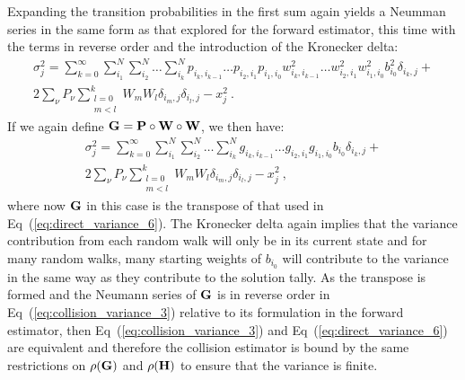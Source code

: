 Expanding the transition probabilities in the first sum again yields a
Neumman series in the same form as that explored for the forward
estimator, this time with the terms in reverse order and the
introduction of the Kronecker delta:
\begin{multline}
  \sigma_j^2 = \sum_{k=0}^{\infty}\sum_{i_1}^{N}\sum_{i_2}^{N}\ldots
  \sum_{i_k}^{N} p_{i_k,i_{k-1}}\ldots p_{i_2,i_1} p_{i_1,i_0}
  w^2_{i_k,i_{k-1}}\ldots w^2_{i_2,i_1} w^2_{i_1,i_0}
  b^2_{i_0}\delta_{i_k,j} + \\ 2 \sum_{\nu} P_{\nu} \sum_{\substack{
      l=0 \\ m<l}}^k W_m W_l \delta_{i_m,j} \delta_{i_l,j} - x_j^2\:.
  \label{eq:collision_variance_2}
\end{multline}
If we again define $\mathbf{G} = \mathbf{P} \circ \mathbf{W} \circ \mathbf{W}$, we
then have:
\begin{multline}
  \sigma^2_j = \sum_{k=0}^{\infty}\sum_{i_1}^{N}\sum_{i_2}^{N}\ldots
  \sum_{i_k}^{N}g_{i_{k},i_{k-1}} \ldots
  g_{i_2,i_1}g_{i_1,i_0}b_{i_0}\delta_{i_k,j} + \\ 2 \sum_{\nu}
  P_{\nu} \sum_{\substack{ l=0 \\ m<l}}^k W_m W_l \delta_{i_m,j}
  \delta_{i_l,j} - x_j^2\:,
\label{eq:collision_variance_3}
\end{multline}
where now $\mathbf{G}$ in this case is the transpose of that used in
Eq~(\ref{eq:direct_variance_6}). The Kronecker delta again implies
that the variance contribution from each random walk will only be in
its current state and for many random walks, many starting weights of
$b_{i_0}$ will contribute to the variance in the same way as they
contribute to the solution tally. As the transpose is formed and the
Neumann series of $\mathbf{G}$ is in reverse order in
Eq~(\ref{eq:collision_variance_3}) relative to its formulation in the
forward estimator, then Eq~(\ref{eq:collision_variance_3}) and
Eq~(\ref{eq:direct_variance_6}) are equivalent and therefore the
collision estimator is bound by the same restrictions on
$\rho(\mathbf{G})$ and $\rho(\mathbf{H})$ to ensure that the variance is
finite.

